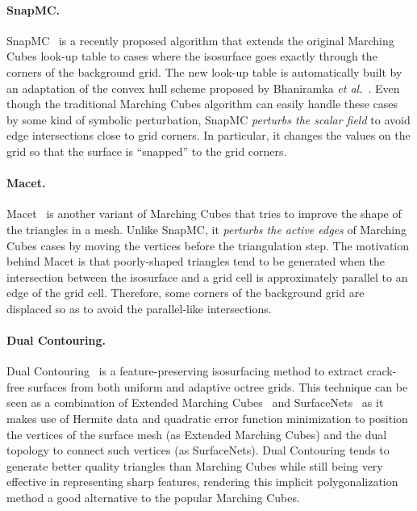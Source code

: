 \paragraph*{SnapMC.} SnapMC~\cite{Raman:2008:QIM} is a recently proposed algorithm
that extends the original Marching Cubes look-up table to cases where
the isosurface goes exactly through the corners of the background
grid.  The new look-up table is automatically built by an adaptation of
the convex hull scheme proposed by
Bhaniramka {\em et al.}~\cite{bhaniramka04}. Even though the traditional Marching
Cubes algorithm can easily handle these cases by some kind of symbolic
perturbation, SnapMC \emph{perturbs the scalar field} to avoid edge
intersections close to grid corners. In particular, it changes
the values on the grid so that the surface is ``snapped'' to the grid
corners.

\paragraph*{Macet.} Macet~\cite{Dietrich:TVCG:2008} is another variant of Marching
Cubes that tries to improve the shape of the triangles in a
mesh. Unlike SnapMC, it \emph{perturbs the active edges} of Marching Cubes
cases by moving the vertices before the triangulation step.  The
motivation behind Macet is that poorly-shaped triangles tend to be
generated when the intersection between the isosurface and a grid cell
is approximately parallel to an edge of the grid cell. Therefore, some
corners of the background grid are displaced so as to avoid the
parallel-like intersections.

\paragraph*{Dual Contouring.} Dual Contouring~\cite{Ju:2002:DCH:566654.566586} is a feature-preserving
isosurfacing method to extract crack-free surfaces from both uniform
and adaptive octree grids. This technique can be seen as a combination of
Extended Marching Cubes~\cite{kobbelt01} and SurfaceNets~\cite{gibson98} 
as it makes use of Hermite data and quadratic error function minimization 
to position the vertices of the surface mesh (as Extended Marching Cubes) 
and the dual topology to connect such vertices (as SurfaceNets).  Dual 
Contouring tends to generate better quality triangles than Marching Cubes 
while still being very effective in representing sharp features, rendering this
implicit polygonalization method a good alternative to the popular Marching Cubes.

